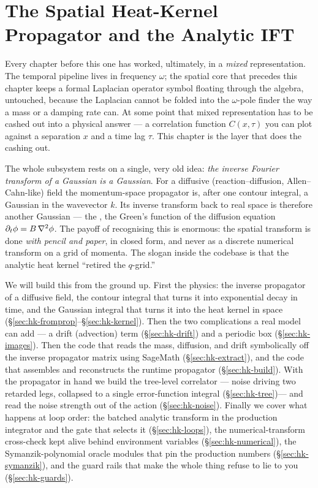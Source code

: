\chapter{The Spatial Heat-Kernel Propagator and the Analytic IFT}\label{ch:spatial-heatkernel}

Every chapter before this one has worked, ultimately, in a \emph{mixed}
representation. The temporal pipeline lives in frequency $\omega$; the spatial
core that precedes this chapter keeps a formal Laplacian operator symbol
floating through the algebra, untouched, because the Laplacian cannot be folded
into the $\omega$-pole finder the way a mass or a damping rate can. At some
point that mixed representation has to be cashed out into a physical answer ---
a correlation function $C(x,\tau)$ you can plot against a separation $x$ and a
time lag $\tau$. This chapter is the layer that does the cashing out.

The whole subsystem rests on a single, very old idea: \emph{the inverse Fourier
transform of a Gaussian is a Gaussian}. For a diffusive (reaction--diffusion,
Allen--Cahn-like) field the momentum-space propagator is, after one contour
integral, a Gaussian in the wavevector $k$. Its inverse transform back to real
space is therefore another Gaussian --- the , the Green's
function of the diffusion equation $\partial_t \phi = B\,\nabla^2\phi$. The payoff
of recognising this is enormous: the spatial transform is done \emph{with
pencil and paper}, in closed form, and never as a discrete numerical transform
on a grid of momenta. The slogan inside the codebase is that the analytic heat
kernel ``retired the $q$-grid.''

We will build this from the ground up. First the physics: the inverse
propagator of a diffusive field, the contour integral that turns it into
exponential decay in time, and the Gaussian integral that turns it into the
heat kernel in space (\S\ref{sec:hk-fromprop}--\S\ref{sec:hk-kernel}). Then the
two complications a real model can add --- a drift (advection) term
(\S\ref{sec:hk-drift}) and a periodic box (\S\ref{sec:hk-images}). Then the
code that reads the mass, diffusion, and drift symbolically off the inverse
propagator matrix using SageMath (\S\ref{sec:hk-extract}), and the code that
assembles and reconstructs the runtime propagator
(\S\ref{sec:hk-build}). With the propagator in hand we build the tree-level
correlator --- noise driving two retarded legs, collapsed to a single
error-function integral (\S\ref{sec:hk-tree})--- and read the noise strength
out of the action (\S\ref{sec:hk-noise}). Finally we cover what happens at
loop order: the batched analytic transform in the production integrator and the
gate that selects it (\S\ref{sec:hk-loops}), the numerical-transform
cross-check kept alive behind environment variables
(\S\ref{sec:hk-numerical}), the Symanzik-polynomial oracle modules that pin the
production numbers (\S\ref{sec:hk-symanzik}), and the guard rails that make the
whole thing refuse to lie to you (\S\ref{sec:hk-guards}).

